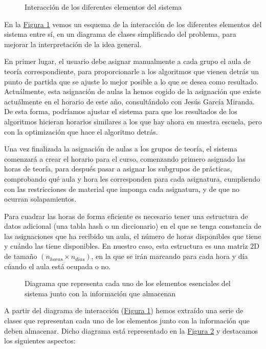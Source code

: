 \begin{figure}[!h]
    \centering
    
    \caption{Interacción de los diferentes elementos del sistema}
    \label{interaccion}
\end{figure}

En la \hyperref[interaccion]{Figura \ref*{interaccion}} vemos un esquema de la interacción de los diferentes elementos del sistema entre sí, en un diagrama de clases simplificado del problema, para mejorar la interpretación de la idea general. 

En primer lugar, el usuario debe asignar manualmente a cada grupo el aula de teoría correspondiente, para proporcionarle a los algoritmos que vienen detrás un punto de partida que se ajuste lo mejor posible a lo que se desea como resultado. Actuálmente, esta asignación de aulas la hemos cogido de la asignación que existe actuálmente en el horario de este año, consultándolo con Jesús García Miranda. De esta forma, podríamos ajustar el sistema para que los resultados de los algoritmos hicieran horarios similares a los que hay ahora en nuestra escuela, pero con la optimización que hace el algoritmo detrás.

Una vez finalizada la asignación de aulas a los grupos de teoría, el sistema comenzará a crear el horario para el curso, comenzando primero asignado las horas de teoría, para después pasar a asignar los subgrupos de prácticas, comprobando qué aula y hora les corresponden para cada asignatura, cumpliendo con las restricciones de material que imponga cada asignatura, y de que no ocurran solapamientos.

Para cuadrar las horas de forma eficiente es necesario tener una estructura de datos adicional (una tabla hash o un diccionario) en el que se tenga constancia de las asignaciones que ha recibido un aula, el número de horas disponibles que tiene y cuándo las tiene disponibles. En nuestro caso, esta estructura es una matriz 2D de tamaño $(n_{horas} \times n_{dias})$, en la que se irán marcando para cada hora y día cúando el aula está ocupada o no.

\begin{figure}[!h]
    \centering
    
    \caption{Diagrama que representa cada uno de los elementos esenciales del sistema junto con la información que almacenan}
    \label{clases}
\end{figure}

A partir del diagrama de interacción (\hyperref[interaccion]{Figura \ref*{interaccion}}) hemos extraído una serie de clases que representan cada uno de los elementos junto con la información que deben almacenar. Dicho diagrama está representado en la \hyperref[clases]{Figura \ref*{clases}} y destacamos los siguientes aspectos:

